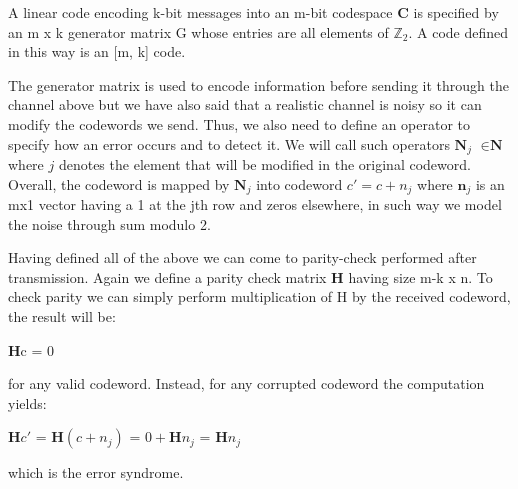 \documentclass[12pt]{report}
\begin{document}
\begin{minipage}{1 \textwidth}
		A linear code encoding k-bit messages into an m-bit codespace \textbf{C} is specified by an m x k generator matrix G whose entries are all elements of $\mathbb{Z}_2$. A code defined in this way is an [m, k] code. \newline 
		
		The generator matrix is used to encode information before sending it through the channel above but we have also said that a realistic channel is noisy so it can modify the codewords we send. Thus, we also need to define an operator to specify how an error occurs and to detect it. We will call such operators $\textbf{N}_j$ $\in \textbf{N}$ where $j$ denotes the element that will be modified in the original codeword. 
		Overall, the codeword is mapped by $\textbf{N}_j$ into codeword $c' =c + n_j$ where $\textbf{n}_j$ is an mx1 vector having a 1 at the jth row and zeros elsewhere, in such way we model the noise through sum modulo 2. \newline
		
		Having defined all of the above we can come to parity-check performed after transmission. Again we define a parity check matrix $\textbf{H}$ having size m-k x n.
		To check parity we can simply perform multiplication of H by the received codeword, the result will be: 
		
		\begin{center}
			\textbf{H}c = 0  
		\end{center}
		
		for any valid codeword. Instead, for any corrupted codeword the computation yields:
		
		\begin{center}
			$\textbf{H}c'$ = $\textbf{H} ( c + n_j )$ = $0 + \textbf{H} n_j $  = $\textbf{H}n_j $ 
		\end{center}
		
		which is the error syndrome. \newline
		
	\end{minipage}
	
	
	
\end{document}
